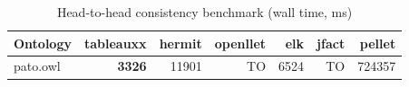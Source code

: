 \begin{table}[t]
\centering
\caption{Head-to-head consistency benchmark (wall time, ms)}
\label{tab:head_to_head_wall_ms}
\begin{tabular}{lrrrrrr}
\toprule
Ontology & tableauxx & hermit & openllet & elk & jfact & pellet \\
\midrule
pato.owl & \textbf{3326} & 11901 & TO & 6524 & TO & 724357 \\
\bottomrule
\end{tabular}
\end{table}
